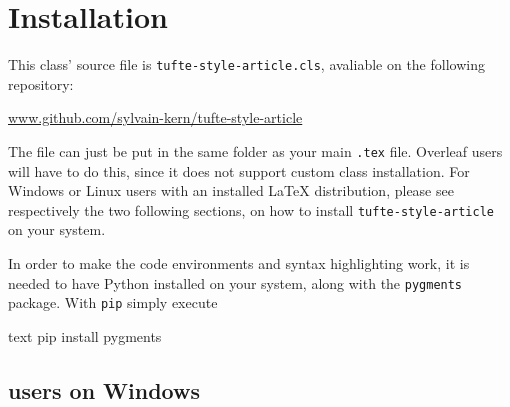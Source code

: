 \documentclass[raggedright, twoside, 11pt]{tufte-style-article}
\begin{document}
\section{Installation}

This class' source file is \texttt{tufte-style-article.cls}, avaliable on the following repository:

\url{www.github.com/sylvain-kern/tufte-style-article}

The file can just be put in the same folder as your main \texttt{.tex} file. Overleaf users will have to do this, since it does not support custom class installation. For Windows or Linux users with an installed \LaTeX{} distribution, please see respectively the two following sections, on how to install \texttt{tufte-style-article} on your system.

In order to make the code environments and syntax highlighting work, it is needed to have Python installed on your system, along with the \texttt{pygments} package. With \texttt{pip} simply execute
\begin{codebox}{text}
pip install pygments
\end{codebox}

\subsection{ users on Windows}
\end{document}
